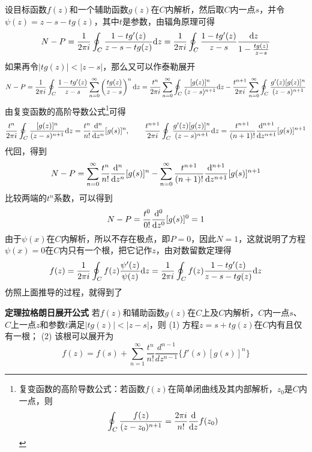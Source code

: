 \documentclass[UTF8]{ctexart}
\newcommand{\trm}[1]{{\rm #1}}
\newenvironment{theorem}[1]
    {\begin{tcolorbox}[enhanced, colback=LightYellow, breakable=true, frame hidden, borderline west={1.5mm}{-2mm}{DarkBlue}]
    {\bfseries {\color{DarkBlue} 定理}\quad #1} \newline}
    {\end{tcolorbox}}
\begin{document}
设目标函数\(f(z)\)和一个辅助函数\(g(z)\)在\(C\)内解析，然后取\(C\)内一点\(s\)，并令\(\psi(z) = z-s-tg(z)\)，其中\(t\)是参数，由辐角原理可得
\[N-P=\frac{1}{2\pi i}\oint_{C}\frac{1-tg'(z)}{z-s-tg(z)}\trm{d}z = \frac{1}{2\pi i}\oint_{C}\frac{1-tg'(z)}{z-s}\frac{\trm{d}z}{1-\frac{tg(z)}{z-s}}\]
如果再令\(|tg(z)|<|z-s|\)，那么又可以作泰勒展开
\[N-P = \frac{1}{2\pi i}\oint_{C}\frac{1-tg'(z)}{z-s}\sum_{n=0}^{\infty}\left(\frac{tg(z)}{z-s}\right)^n\trm{d}z = \frac{t^n}{2\pi i}\sum_{n=0}^{\infty}\oint_{C}\frac{[g(z)]^n}{(z-s)^{n+1}}\trm{d}z-\frac{t^{n+1}}{2 \pi i}\sum_{n=0}^{\infty}\oint_{C}\frac{g'(z)[g(z)]^{n}}{(z-s)^{n+1}}\]
由复变函数的高阶导数公式\footnote{复变函数的高阶导数公式：若函数\(f(z)\)在简单闭曲线及其内部解析，\(z_0\)是\(C\)内一点，则\[\oint_C \frac{f(z)}{(z-z_0)^{n+1}} = \frac{2\pi i}{n!}\dfrac{\trm{d}}{\trm{d}z}f(z_0)\]}可得
\[\frac{t^n}{2\pi i}\oint_{C}\frac{[g(z)]^n}{(z-s)^{n+1}}\trm{d}z = \frac{t^{n}}{n!}\frac{\trm{d}^n}{\trm{d}z^n}[g(s)]^{n}, \qquad \frac{t^{n+1}}{2\pi i}\oint_{C}\frac{g'(z)[g(z)]^n}{(z-s)^{n+1}}\trm{d}z = \frac{t^{n+1}}{(n+1)!}\frac{\trm{d}^{n+1}}{\trm{d}z^{n+1}}[g(s)]^{n+1}\]
代回，得到
\[N-P=\sum_{n=0}^{\infty}\frac{t^{n}}{n!}\frac{\trm{d}^n}{\trm{d}z^n}[g(s)]^{n}-\sum_{n=0}^{\infty}\frac{t^{n+1}}{(n+1)!}\frac{\trm{d}^{n+1}}{\trm{d}z^{n+1}}[g(s)]^{n+1}\]
比较两端的\(t^n\)系数，可以得到
\[N-P=\frac{t^{0}}{0!}\frac{\trm{d}^0}{\trm{d}z^0}[g(s)]^{0}=1\]
由于\(\psi(x)\)在\(C\)内解析，所以不存在极点，即\(P=0\)，因此\(N=1\)，这就说明了方程\(\psi(x)=0\)在\(C\)内只有一个根，把它记作\(z\)，由对数留数定理得
\[f(z)=\frac{1}{2\pi i}\oint_{C}f(z)\frac{\psi'(z)}{\psi(z)}\trm{d}z = \frac{1}{2\pi i}\oint_{C}f(z)\frac{1-tg'(z)}{z-s-tg(z)}\trm{d}z\]
仿照上面推导的过程，就得到了
\begin{theorem}{拉格朗日展开公式}
    若\(f(z)\)和辅助函数\(g(z)\)在\(C\)上及\(C\)内解析，\(C\)内一点\(s\)、\(C\)上一点\(z\)和参数\(t\)满足\(|tg(z)|<|z-s|\)，则\newline
    (1) 方程\(z=s+tg(z)\)在\(C\)内有且仅有一根；\newline
    (2) 该根可以展开为
    \[f(z) = f(s)+\sum_{n=1}^{\infty}\frac{t^n}{n!}\frac{d^{n-1}}{dz^{n-1}}\{f'(s)[g(s)]^n\}\]
\end{theorem}

\end{document}
